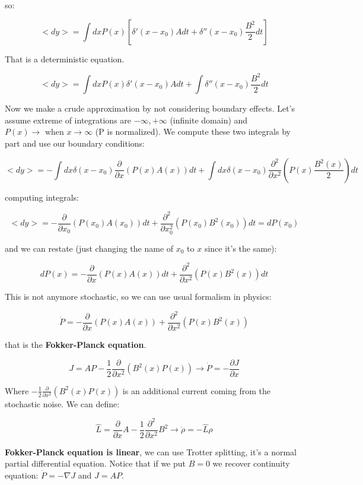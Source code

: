 \documentclass[a4paper, italian, openany]{book}
\begin{document}
so:

$$<dy> = \int dx P(x) \left [ \delta'(x-x_0)Adt+\delta''(x-x_0)\frac{B^2}{2}dt \right ]$$

That is a deterministic equation.

$$<dy> = \int dx P(x)\delta'(x-x_0)Adt + \int \delta''(x-x_0)\frac{B^2}{2}dt$$

Now we make a crude approximation by not considering boundary effects. Let's assume extreme of integrations are $-\infty, +\infty$ (infinite domain) and $P(x) \to \mbox{ when } x \to \infty$ (P is normalized).\newline
We compute these two integrals by part and use our boundary conditions:

$$<dy> = -\int dx \delta(x-x_0) \frac{\partial}{\partial x} (P(x) A(x)) dt + \int dx \delta(x-x_0) \frac{\partial^2}{\partial x^2}\left ( P(x) \frac{B^2(x)}{2} \right ) dt$$

computing integrals:

$$<dy> = -\frac{\partial}{\partial x_0} \left ( P(x_0) A(x_0)\right ) dt + \frac{\partial^2}{\partial x_0^2} \left ( P(x_0) B^2(x_0) \right ) dt = dP(x_0)$$

and we can restate (just changing the name of $x_0$ to $x$ since it's the same):

$$dP(x) = -\frac{\partial}{\partial x} \left ( P(x) A(x)\right ) dt + \frac{\partial^2}{\partial x^2} \left ( P(x) B^2(x) \right ) dt$$

This is not anymore stochastic, so we can use usual formalism in physics:

$$\dot{P} = -\frac{\partial}{\partial x} \left ( P(x) A(x)\right ) + \frac{\partial^2}{\partial x^2} \left ( P(x) B^2(x) \right )$$

that is the \textbf{Fokker-Planck equation}.\newline

$$J = AP -\frac{1}{2} \frac{\partial}{\partial x^2} \left ( B^2(x) P(x) \right ) \rightarrow \dot{P} = - \frac{\partial J}{\partial x}$$

Where $ -\frac{1}{2} \frac{\partial}{\partial x^2} \left ( B^2(x) P(x) \right )$ is an additional current coming from the stochastic noise.\newline
We can define:

$$\hat{L} = \frac{\partial}{\partial x} A - \frac{1}{2} \frac{\partial^2}{\partial x^2} B^2 \rightarrow \dot{\rho} = -\hat{L} \rho$$

\textbf{Fokker-Planck equation is linear}, we can use Trotter splitting, it's a normal partial differential equation.
Notice that if we put $B=0$ we recover continuity equation: $\dot{P} = -\nabla J$ and $J=AP$.
\end{document}
